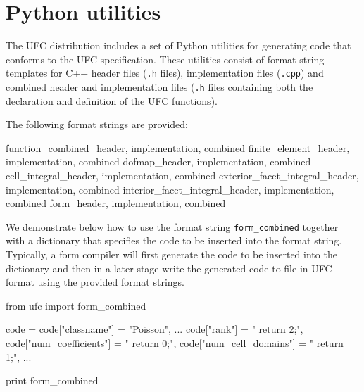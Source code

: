 \chapter{Python utilities}

The UFC distribution includes a set of Python utilities for generating
code that conforms to the UFC specification. These utilities consist
of format string templates for C++ header files (\texttt{.h} files),
implementation files (\texttt{.cpp}) and combined header and
implementation files (\texttt{.h} files containing both the
declaration and definition of the UFC functions).

The following format strings are provided:

\begin{code}
function_combined_{header, implementation, combined}
finite_element_{header, implementation, combined}
dofmap_{header, implementation, combined}
cell_integral_{header, implementation, combined}
exterior_facet_integral_{header, implementation, combined}
interior_facet_integral_{header, implementation, combined}
form_{header, implementation, combined}
\end{code}

We demonstrate below how to use the format string
\texttt{form\_combined} together with a dictionary that specifies the
code to be inserted into the format string. Typically, a form compiler
will first generate the code to be inserted into the dictionary and
then in a later stage write the generated code to file in UFC format
using the provided format strings.

\begin{code}
from ufc import form_combined

code = {}
code["classname"] = "Poisson",
...
code["rank"] = "    return 2;",
code["num_coefficients"] = "    return 0;",
code["num_cell_domains"] = "    return 1;",
...

print form_combined %
\end{code}

